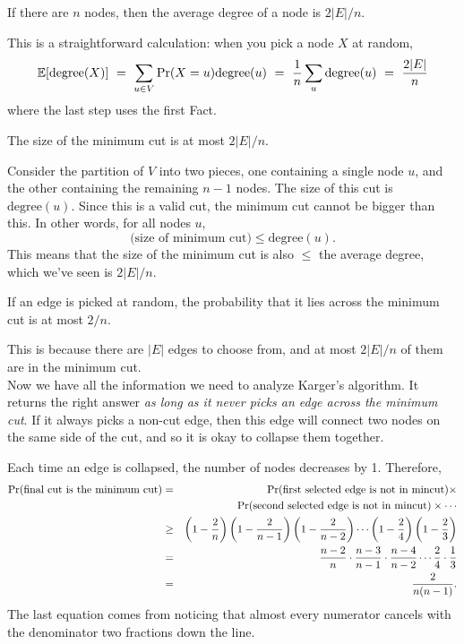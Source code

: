 \begin{fact}
If there are $n$ nodes, then the average degree of a node is $2|E|/n$.
\end{fact}
This is a straightforward calculation: when you pick a node $X$ at random,
$$ 
\E[\mbox{degree}(X)] 
\ = \ 
\sum_{u \in V} \pr(X = u) \mbox{degree}(u) 
\ = \ 
\frac{1}{n} \sum_u \mbox{degree}(u) 
\ = \ 
\frac{2|E|}{n}
$$
where the last step uses the first Fact.

\begin{fact}
The size of the minimum cut is at most $2|E|/n$.
\end{fact}
Consider the partition of $V$ into two pieces, one containing a single node $u$, and the 
other containing the remaining $n-1$ nodes. The size of this cut is $\mbox{degree}(u)$.
Since this is a valid cut, the minimum cut cannot be bigger than this. In other words,
for all nodes $u$,
$$ \mbox{(size of minimum cut)} \leq \mbox{degree}(u) .$$
This means that the size of the minimum cut is also $\leq$ the average degree, which 
we've seen is $2|E|/n$.

\begin{fact}
If an edge is picked at random, the probability that it lies across the minimum cut is 
at most $2/n$.
\end{fact}
This is because there are $|E|$ edges to choose from, and at most $2|E|/n$ of them are
in the minimum cut.
\\

Now we have all the information we need to analyze Karger's algorithm. It returns the
right answer {\it as long as it never picks an edge across the minimum cut}. If it always 
picks a non-cut edge, then this edge will connect two nodes on the same side of the cut,
and so it is okay to collapse them together.

Each time an edge is collapsed, the number of nodes decreases by 1. Therefore,
\begin{eqnarray*}
\mbox{\rm Pr}(\mbox{final cut is the minimum cut})
& = &
\mbox{\rm Pr}(\mbox{first selected edge is not in mincut}) \times \\
& & \mbox{\rm Pr}(\mbox{second selected edge is not in mincut}) \times \cdots \\
& \geq & 
\left( 1 - \frac{2}{n} \right) \left( 1 - \frac{2}{n-1} \right) 
\left( 1 - \frac{2}{n-2} \right) \cdots \left( 1 - \frac{2}{4} \right) 
\left( 1 - \frac{2}{3} \right) \\
& = & 
\frac{n-2}{n} \cdot \frac{n-3}{n-1} \cdot \frac{n-4}{n-2} \cdots \frac{2}{4} \cdot 
\frac{1}{3} \\
& = & 
\frac{2}{n(n-1)} .
\end{eqnarray*}
The last equation comes from noticing that almost every numerator cancels with the 
denominator two fractions down the line.

